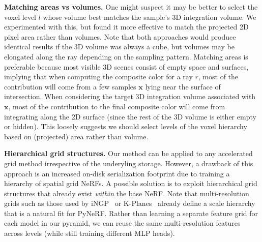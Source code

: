 \documentclass{article}
\newcommand{\method}{PyNeRF\xspace}
\begin{document}
{\bf Matching areas vs volumes.} One might suspect it may be better to select the voxel level $l$ whose volume best matches the sample's 3D integration volume. We experimented with this, but found it more effective to match the projected 2D pixel area rather than volumes. Note that both approaches would produce identical results if the 3D volume was always a cube, but volumes may be elongated along the ray depending on the sampling pattern. Matching areas is preferable because most visible 3D scenes consist of empty space and surfaces, implying that when computing the composite color for a ray $r$, most of the contribution will come from a few
samples $\mathbf{x}$ lying near the surface of intersection. When considering the target 3D integration volume associated with $\mathbf{x}$, most of the contribution to the final composite color will come from integrating along the 2D surface (since the rest of the 3D volume is either empty or hidden). This loosely suggests we should select levels of the voxel hierarchy based on (projected) area rather than volume. 

{\bf Hierarchical grid structures.} Our method can be applied to any accelerated grid method irrespective of the underyling storage. However, a drawback of this approach is an increased on-disk serialization footprint due to training a hierarchy of spatial grid NeRFs. A possible solution is to exploit hierarchical grid structures that already exist {\em within} the base NeRF.  Note that multi-resolution grids such as those used by iNGP~\cite{mueller2022instant} or K-Planes~\cite{kplanes_2023} already define a scale hierarchy that is a natural fit for \method. Rather than learning a separate feature grid for each model in our pyramid, we can reuse the same multi-resolution features across levels (while still training different MLP heads).
\end{document}
